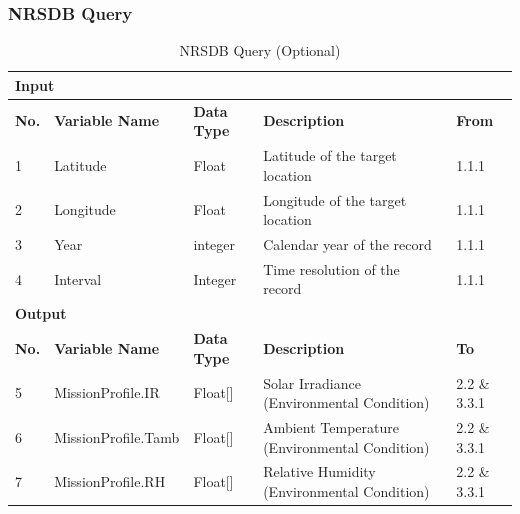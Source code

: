 \documentclass{article}
\begin{document}
\subsubsection{NRSDB Query}
\begin{table}[h]
\centering
\caption{NRSDB Query (Optional)}
\begin{tabular}{|l|l|l|p{5cm}|p{3cm}|}
\hline
\multicolumn{5}{|l|}{\textbf{Input}} \\ \hline
\textbf{No.} & \textbf{Variable Name} & \textbf{Data Type} & \textbf{Description} & \textbf{From} \\ \hline
1 & Latitude & Float & Latitude of the target location & 1.1.1 \\ \hline
2 & Longitude & Float & Longitude of the target location & 1.1.1 \\ \hline
3 & Year & integer & Calendar year of the record & 1.1.1 \\ \hline
4 & Interval & Integer & Time resolution of the record & 1.1.1 \\ \hline
\multicolumn{5}{|l|}{\textbf{Output}} \\ \hline
\textbf{No.} & \textbf{Variable Name} & \textbf{Data Type} & \textbf{Description} & \textbf{To} \\ \hline
5 & MissionProfile.IR & Float[] & Solar Irradiance (Environmental Condition) & 2.2 \& 3.3.1 \\ \hline
6 & MissionProfile.Tamb & Float[] & Ambient Temperature (Environmental Condition) & 2.2 \& 3.3.1 \\ \hline
7 & MissionProfile.RH & Float[] & Relative Humidity (Environmental Condition) & 2.2 \& 3.3.1 \\ \hline
\end{tabular}
\end{table}
\end{document}
